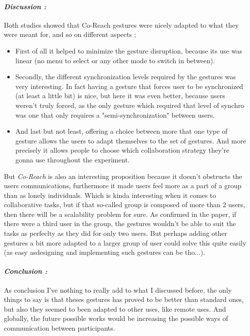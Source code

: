     \paragraph{ \textit{Discussion :}
                \newline }
    \indent \indent Both studies showed that Co-Reach gestures were nicely adapted to what they were meant for, and so on different aspects ;
    \begin{itemize}
        \item First of all it helped to minimize the gesture disruption, because its use was linear (no menu to select or any other mode to switch in between).
        \item Secondly, the different synchronization levels required by the gestures was very interesting. In fact having a gesture that forces user to be synchronized (at least a little bit) is nice, but here it was even better,
            because users weren't truly forced, as the only gesture which required that level of synchro was one that only requires a "semi-synchronization" between users.
        \item And last but not least, offering a choice between more that one type of gesture allows the users to adapt themselves to the set of gestures. And more precisely it allows people to choose which collaboration strategy
            they're gonna use throughout the experiment.
    \end{itemize}
    \indent \indent But \textit{Co-Reach} is also an interesting proposition because it doesn't obstructs the users communications, furthermore it made users feel more as a part of a group than as 
    lonely individuals. Which is kinda interesting when it comes to collaborative tasks, but if that so-called group is composed of more than 2 users, then there will be a scalability problem for sure. 
    \newline
    \indent \indent As confirmed in the paper, if there were a third user in the group, the gestures wouldn't be able to suit the tasks as perfeclty as they did for only two users. But perhaps adding other 
    gestures a bit more adapted to a larger group of user could solve this quite easily (as easy asdesigning and implementing such gestures can be tho...). 

    \paragraph{ \textit{Conclusion :}
                \newline }
    \indent \indent As conclusion I've nothing to really add to what I discussed before, the only things to say is that theses gestures has proved to be better than standard ones, but also they seemed
    to been adapted to other uses, like remote uses. And globally, the future possible works would be increasing the possible ways of communication between participants.
    